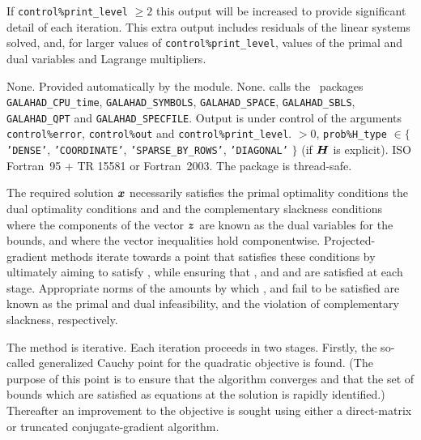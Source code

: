 \documentclass{galahad}
\newcommand{\packagename}{BQP}
\begin{document}
If {\tt control\%print\_level} $\geq 2$ this 
output will be increased to provide significant detail of each iteration. 
This extra output includes residuals of the linear systems solved, and,
for larger values of {\tt control\%print\_level}, values of the primal and dual
variables and Lagrange multipliers. 


\galgeneral

\galcommon None.
\galworkspace Provided automatically by the module.
\galroutines None. 
\galmodules {\tt \packagename\_solve} calls the \galahad\ packages
{\tt GALAHAD\_CPU\_time},
{\tt GALAHAD\_SY\-M\-BOLS}, \newline
{\tt GALAHAD\_SPACE}, 
{\tt GALAHAD\_SBLS},
{\tt GALAHAD\_QPT} and
{\tt GALAHAD\_SPECFILE}.
\galio Output is under control of the arguments
 {\tt control\%error}, {\tt control\%out} and {\tt control\%print\_level}.
 $> 0$, 
{\tt prob\%H\_type} $\in \{${\tt 'DENSE'}, 
 {\tt 'COORDINATE'}, {\tt 'SPARSE\_BY\_\-ROWS'}, {\tt 'DIAGONAL'} $\}$
(if ${\bm{H}}$ is explicit).
\galportability ISO Fortran~95 + TR 15581 or Fortran~2003. 
The package is thread-safe.


\galmethod
The required solution ${\bm{x}}$ necessarily satisfies 
the primal optimality conditions
the dual optimality conditions
and 
and the complementary slackness conditions 
where the components of the vector ${\bm{z}}$ are known as 
the dual variables for the bounds,
and where the vector inequalities hold componentwise.
Projected-gradient methods iterate towards a point
that satisfies these conditions by ultimately aiming to satisfy
, while ensuring that 
, and  and  are satisfied at each stage. 
Appropriate norms of the amounts by 
which ,  and  fail to be satisfied are known as the
primal and dual infeasibility, and the violation of complementary slackness,
respectively. 

The method is iterative. Each iteration proceeds in two stages.
Firstly, the so-called generalized Cauchy point for the quadratic
objective is found.  (The purpose of this point is to ensure that the
algorithm converges and that the set of bounds which are satisfied as
equations at the solution is rapidly identified.)  Thereafter an
improvement to the objective is sought using either a
direct-matrix or truncated conjugate-gradient algorithm.
\end{document}
